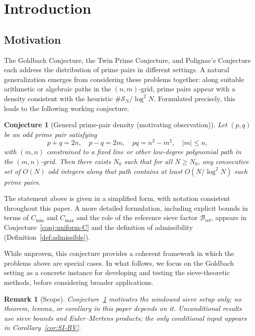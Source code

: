 \documentclass[11pt]{article}
\theoremstyle{inline}
\newtheorem*{remark}{Remark}
\theoremstyle{break}
\theoremstyle{break}
\theoremstyle{break}
\theoremstyle{break}
\theoremstyle{break}
\newtheorem{conjecture}{Conjecture}
\theoremstyle{break}
\theoremstyle{break}
\theoremstyle{inline}
\newcommand{\tref}{{\scriptscriptstyle\mathrm{ref}}}
\newcommand{\Cmeas}{C}              %
\newcommand{\Bref}{\mathcal{B}_\tref}
\begin{document}

\section*{Introduction}

\subsection*{Motivation}
The Goldbach Conjecture, the Twin Prime Conjecture, and Polignac’s Conjecture each address the distribution of prime pairs in different settings.  
A natural generalization emerges from considering these problems together: along suitable arithmetic or algebraic paths in the \( (n,m) \)-grid, prime pairs appear with a density consistent with the heuristic \( \#\mathcal{S}_N / \log^2 N \).  
Formulated precisely, this leads to the following working conjecture.

\begin{conjecture}[General prime-pair density (motivating observation)]\label{conj:gppd}
Let \( (p,q) \) be an odd prime pair satisfying
\begin{equation}
p+q = 2n,\quad p-q = 2m,\quad pq = n^2 - m^2,\quad |m| \le n,
\end{equation}
with \( (m,n) \) constrained to a fixed line or other low-degree polynomial path in the \( (m,n) \)-grid.  
Then there exists \( N_0 \) such that for all \( N \ge N_0 \), any consecutive set of \( O(N) \) odd integers along that path contains at least \( O(N / \log^2 N) \) such prime pairs.
\end{conjecture}

The statement above is given in a simplified form, with notation consistent throughout this paper.  
A more detailed formulation, including explicit bounds in terms of \( \Cmeas_{\min} \) and \( \Cmeas_{\max} \) and the role of the reference sieve factor \( \Bref \), appears in Conjecture~\ref{conj:uniform-C} and the definition of admissibility (Definition~\ref{def:admissible}).

While unproven, this conjecture provides a coherent framework in which the problems above are special cases.  
In what follows, we focus on the Goldbach setting as a concrete instance for developing and testing the sieve-theoretic methods,  
before considering broader applications.

\begin{remark}[Scope]
Conjecture~\ref{conj:gppd} motivates the windowed sieve setup only; no theorem, lemma, or corollary in this paper depends on it. Unconditional results use sieve bounds and Euler–Mertens products; the only conditional input appears in Corollary~\ref{cor:SI-BV}.
\end{remark}
\end{document}
